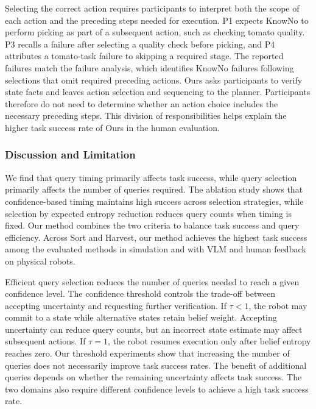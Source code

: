 Selecting the correct action requires participants to interpret both the scope of each action and the preceding steps needed for execution. P1 expects KnowNo to perform picking as part of a subsequent action, such as checking tomato quality. P3 recalls a failure after selecting a quality check before picking, and P4 attributes a tomato-task failure to skipping a required stage. The reported failures match the failure analysis, which identifies KnowNo failures following selections that omit required preceding actions. Ours asks participants to verify state facts and leaves action selection and sequencing to the planner. Participants therefore do not need to determine whether an action choice includes the necessary preceding steps. This division of responsibilities helps explain the higher task success rate of Ours in the human evaluation.


\subsubsection{Discussion and Limitation}\label{exp:discussion}
We find that query timing primarily affects task success, while query selection primarily affects the number of queries required. The ablation study shows that confidence-based timing maintains high success across selection strategies, while selection by expected entropy reduction reduces query counts when timing is fixed. Our method combines the two criteria to balance task success and query efficiency. Across Sort and Harvest, our method achieves the highest task success among the evaluated methods in simulation and with VLM and human feedback on physical robots.



Efficient query selection reduces the number of queries needed to reach a given confidence level. The confidence threshold controls the trade-off between accepting uncertainty and requesting further verification. If $\tau<1$, the robot may commit to a state while alternative states retain belief weight. Accepting uncertainty can reduce query counts, but an incorrect state estimate may affect subsequent actions. If $\tau=1$, the robot resumes execution only after belief entropy reaches zero. Our threshold experiments show that increasing the number of queries does not necessarily improve task success rates. The benefit of additional queries depends on whether the remaining uncertainty affects task success. The two domains also require different confidence levels to achieve a high task success rate.

